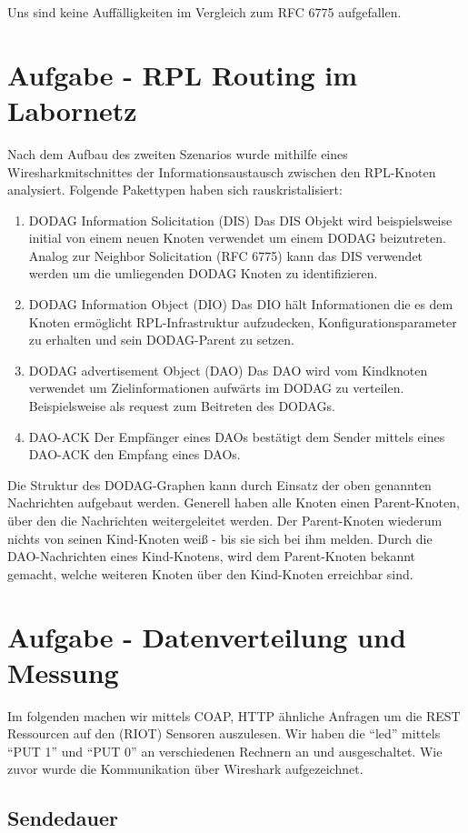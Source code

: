\documentclass[paper=a4, fontsize=11pt]{scrartcl} %
\numberwithin{equation}{section} %
\numberwithin{figure}{section} %
\numberwithin{table}{section} %
\begin{document}
Uns sind keine Auffälligkeiten im Vergleich zum RFC 6775 aufgefallen.

\section{Aufgabe - RPL Routing im Labornetz}
Nach dem Aufbau des zweiten Szenarios wurde mithilfe eines Wiresharkmitschnittes der Informationsaustausch zwischen den RPL-Knoten analysiert. Folgende Pakettypen haben sich rauskristalisiert:
\begin{enumerate}
  \item DODAG Information Solicitation (DIS)
  Das DIS Objekt wird beispielsweise initial von einem neuen Knoten verwendet um einem DODAG beizutreten. Analog zur Neighbor Solicitation (RFC 6775) kann das DIS verwendet werden um die umliegenden DODAG Knoten zu identifizieren.
  \item DODAG Information Object (DIO)
  Das DIO hält Informationen die es dem Knoten ermöglicht RPL-Infrastruktur aufzudecken, Konfigurationsparameter zu erhalten und sein DODAG-Parent zu setzen.
  \item DODAG advertisement Object (DAO)
  Das DAO wird vom Kindknoten verwendet um Zielinformationen aufwärts im DODAG zu verteilen. Beispielsweise als request zum Beitreten des DODAGs.
  \item DAO-ACK
  Der Empfänger eines DAOs bestätigt dem Sender mittels eines DAO-ACK den Empfang eines DAOs.
\end{enumerate}
Die Struktur des DODAG-Graphen kann durch Einsatz der oben genannten Nachrichten aufgebaut werden. Generell haben alle Knoten einen Parent-Knoten, über den die Nachrichten weitergeleitet werden. Der Parent-Knoten wiederum nichts von seinen Kind-Knoten weiß - bis sie sich bei ihm melden. Durch die DAO-Nachrichten eines Kind-Knotens, wird dem Parent-Knoten bekannt gemacht, welche weiteren Knoten über den Kind-Knoten erreichbar sind.
\section{Aufgabe - Datenverteilung und Messung}

Im folgenden machen wir mittels COAP, HTTP ähnliche Anfragen um die REST Ressourcen auf den (RIOT) Sensoren auszulesen. Wir haben die ``led'' mittels ``PUT 1'' und ``PUT 0'' an verschiedenen Rechnern an und ausgeschaltet. Wie zuvor wurde die Kommunikation über Wireshark aufgezeichnet.

\subsection{Sendedauer}
\end{document}
